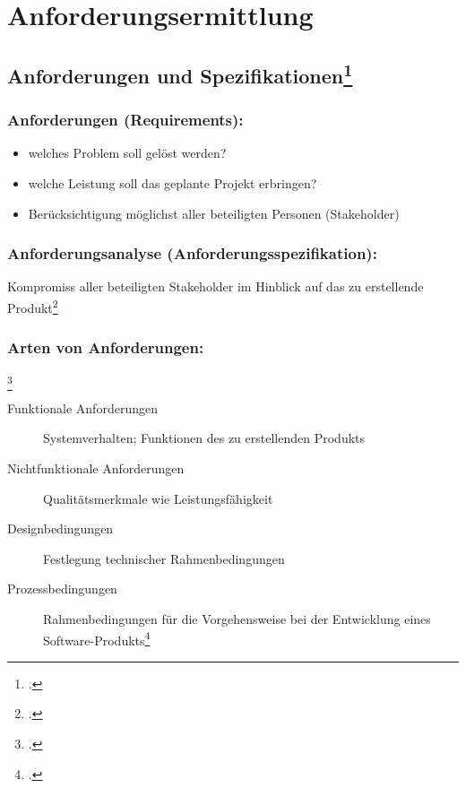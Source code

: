 \documentclass{bschlangaul-theorie}
\begin{document}

\chapter{Anforderungsermittlung}

%

\section{Anforderungen und Spezifikationen\footcite[Seite 13]{sosy:fs:1}}

\subsection{Anforderungen (Requirements):}

\begin{itemize}
\item welches Problem soll gelöst werden?
\item welche Leistung soll das geplante Projekt erbringen?
\item Berücksichtigung möglichst aller beteiligten Personen (Stakeholder)
\end{itemize}

\subsection{Anforderungsanalyse (Anforderungsspezifikation):}

Kompromiss aller beteiligten Stakeholder im Hinblick auf das zu
erstellende Produkt\footcite[Seite 17-20]{schatten}

\subsection{Arten von Anforderungen:}\footcite[Seite 14]{sosy:fs:1}

\begin{description}
\item[Funktionale Anforderungen]
Systemverhalten; Funktionen des zu erstellenden Produkts

\item[Nichtfunktionale Anforderungen]
Qualitätsmerkmale wie \zB Leistungsfähigkeit

\item[Designbedingungen]
Festlegung technischer Rahmenbedingungen

\item[Prozessbedingungen]
Rahmenbedingungen für die Vorgehensweise bei der Entwicklung eines
Software-Produkts\footcite[Seite 20-22]{text}
\end{description}
\end{document}
